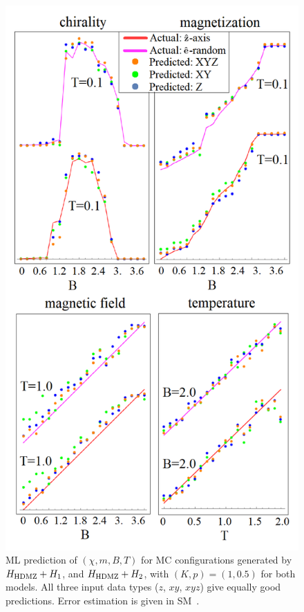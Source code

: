 \documentclass[reprint,amsmath,amssymb,aps,showpacs,superscriptaddress,prl]{revtex4-1}
\begin{document}
\begin{figure}[t]
\includegraphics[scale=0.36]{fig4.png}
\caption{ML prediction of $(\chi, m, B, T)$ for MC configurations generated by $H_{\rm HDMZ}+ H_1$, and $H_{\rm HDMZ} + H_2$, with $(K,p)=(1, 0.5)$ for both models.  All three input data types ($z$, $xy$, $xyz$) give equally good predictions. Error estimation is given in SM~\cite{SM}. } \label{fig:4}
\end{figure}
\end{document}

